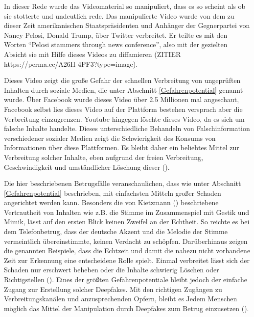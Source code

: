 In dieser Rede wurde das Videomaterial so manipuliert, dass es so scheint als ob sie stotterte und undeutlich rede.
Das manipulierte Video wurde von dem zu dieser Zeit amerikanischen Staatspräsidenten und Anhänger der Gegnerpartei von Nancy Pelosi, Donald Trump, über Twitter verbreitet.
Er teilte es mit den Worten ``Pelosi stammers through news conference'', also mit der gezielten Absicht sie mit Hilfe dieses Videos zu diffamieren (ZITIER https://perma.cc/A26H-4PF3?type=image).
\par
Dieses Video zeigt die große Gefahr der schnellen Verbreitung von ungeprüften Inhalten durch soziale Medien, die unter Abschnitt \ref{Gefahrenpotential} genannt wurde.
Über Facebook wurde dieses Video über 2.5 Millionen mal angeschaut, Facebook selbst lies dieses Video auf der Plattform bestehen versprach aber die Verbreitung einzugrenzen.
Youtube hingegen löschte dieses Video, da es sich um falsche Inhalte handelte.
Dieses unterschiedliche Behandeln von Falschinformation verschiedener sozialer Medien zeigt die Schwierigkeit des Konsums von Informationen über diese Plattformen.
Es bleibt daher ein beliebtes Mittel zur Verbreitung solcher Inhalte, eben aufgrund der freien Verbreitung, Geschwindigkeit und umständlicher Löschung dieser (\cite{Appel2022}).
\par
Die hier beschriebenen Betrugsfälle veranschaulichen, dass wie unter Abschnitt \ref{Gefahrenpotential} beschrieben, mit einfachsten Mitteln großer Schaden angerichtet werden kann.
Besonders die von Kietzmann (\cite{Kietzmann2020}) beschriebene Vertrautheit von Inhalten wie z.B. die Stimme im Zusammenspiel mit Gestik und Mimik, lässt auf den ersten Blick keinen Zweifel an der Echtheit.
So reichte es bei dem Telefonbetrug, dass der deutsche Akzent und die Melodie der Stimme vermeintlich übereinstimmte, keinen Verdacht zu schöpfen.
Darüberhinaus zeigen die genannten Beispiele, dass die Echtzeit und damit die nahezu nicht vorhandene Zeit zur Erkennung eine entscheidene Rolle spielt.
Einmal verbreitet lässt sich der Schaden nur erschwert beheben oder die Inhalte schwierig Löschen oder Richtigstellen (\cite{Shahzad2022}).
Eines der größten Gefahrenpotentiale bleibt jedoch der einfache Zugang zur Erstellung solcher Deepfakes.
Mit den richtigen Zugängen zu Verbreitungskanälen und anzusprechenden Opfern, bleibt es Jedem Menschen möglich das Mittel der Manipulation durch Deepfakes zum Betrug einzusetzen (\cite{Appel2022}).


